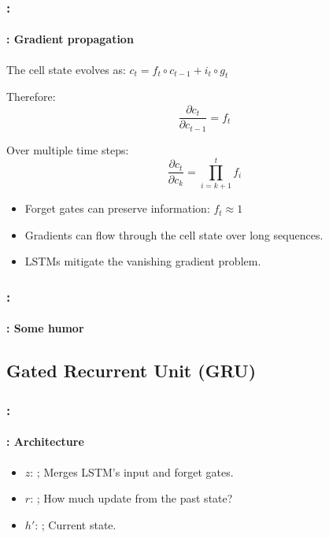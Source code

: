 \documentclass[xcolor=table]{beamer}
\begin{document}
\begin{frame}
	\frametitle{\insertshortsubtitle: \insertsection}
	\framesubtitle{\insertsubsection: Gradient propagation}
	
	The cell state evolves as: $c_t = f_t \circ c_{t-1} + i_t \circ g_t$
	
	Therefore: \[\frac{\partial c_t}{\partial c_{t-1}} = f_t\]
	
	Over multiple time steps: \[\frac{\partial c_t}{\partial c_k} = \prod_{i=k+1}^{t} f_i\]
	
	\begin{itemize}
		\item Forget gates can preserve information: $f_t \approx 1$
		
		\item Gradients can flow through the cell state over long sequences.
		
		\item LSTMs mitigate the vanishing gradient problem.
	\end{itemize}
	
\end{frame}

\begin{frame}
	\frametitle{\insertshortsubtitle: \insertsection}
	\framesubtitle{\insertsubsection: Some humor}
	
	\begin{center}
	\end{center}
	
\end{frame}

\subsection{Gated Recurrent Unit (GRU)}


\begin{frame}
	\frametitle{\insertshortsubtitle: \insertsection}
	\framesubtitle{\insertsubsection: Architecture}
	
	\begin{minipage}{0.50\textwidth} 
		\begin{itemize}
			\item $z$: ;
			Merges LSTM's input and forget gates. 
			\item $r$: ; 
			How much update from the past state?
			\item $h'$: ;
			Current state.	
		\end{itemize}
	\end{minipage}
	\begin{minipage}{0.49\textwidth}
	\end{minipage}
	
\end{frame}
\end{document}
